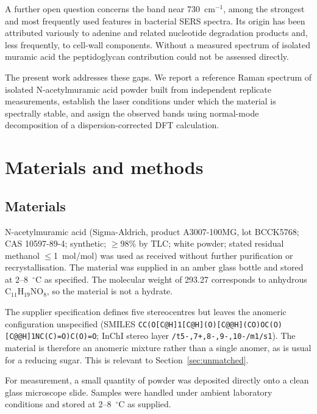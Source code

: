 \documentclass[preprint,12pt]{elsarticle}
\newcommand{\wn}{\ensuremath{\mathrm{cm}^{-1}}}
\begin{document}
A further open question concerns the band near 730~\wn{}, among the strongest
and most frequently used features in bacterial SERS spectra. Its origin has been
attributed variously to adenine and related nucleotide degradation products
\cite{premasiri2016origins, kubryk2016origin} and, less frequently, to cell-wall
components. Without a measured spectrum of isolated muramic acid the
peptidoglycan contribution could not be assessed directly.

The present work addresses these gaps. We report a reference Raman spectrum of
isolated N-acetylmuramic acid powder built from independent replicate
measurements, establish the laser conditions under which the material is
spectrally stable, and assign the observed bands using normal-mode decomposition
of a dispersion-corrected DFT calculation.

\section{Materials and methods}

\subsection{Materials}

N-acetylmuramic acid (Sigma-Aldrich, product A3007-100MG, lot BCCK5768;
CAS 10597-89-4; synthetic; $\geq$98\% by TLC; white powder; stated residual
methanol $\leq$1~mol/mol) was used as received without further purification or
recrystallisation. The material was supplied in an amber glass bottle and stored
at 2--8~$^{\circ}$C as specified. The molecular weight of 293.27 corresponds to
anhydrous C$_{11}$H$_{19}$NO$_8$, so the material is not a hydrate.

The supplier specification defines five stereocentres but leaves the anomeric
configuration unspecified (SMILES
\texttt{CC(O[C@H]1[C@H](O)[C@@H](CO)OC(O)[C@@H]1NC(C)=O)C(O)=O}; InChI stereo
layer \texttt{/t5-,7+,8-,9-,10-/m1/s1}). The material is therefore an anomeric
mixture rather than a single anomer, as is usual for a reducing sugar. This is
relevant to Section~\ref{sec:unmatched}.

For measurement, a small quantity of powder was deposited directly onto a clean
glass microscope slide. Samples were handled under ambient laboratory conditions
and stored at 2--8~$^\circ$C as supplied.
\end{document}
